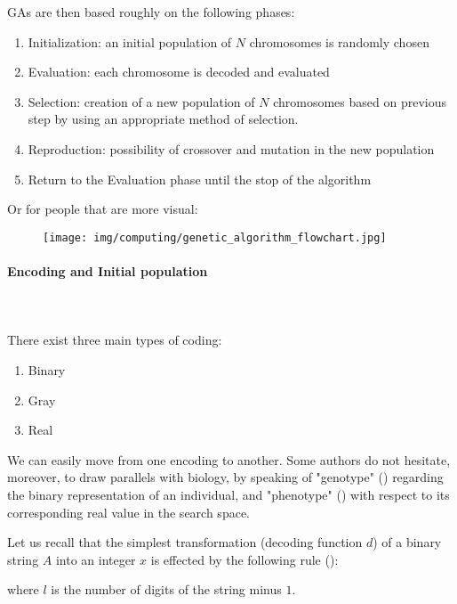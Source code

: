 	GAs are then based roughly on the following phases:
	\begin{enumerate}
		\item Initialization: an initial population of $N$ chromosomes is randomly chosen

		\item Evaluation: each chromosome is decoded and evaluated

		\item Selection: creation of a new population of $N$ chromosomes based on previous step by using an appropriate method of selection.

		\item Reproduction: possibility of crossover and mutation in the new population

		\item Return to the Evaluation phase until the stop of the algorithm
	\end{enumerate}
	Or for people that are more visual:
	\begin{figure}[H]
		\centering
		\texttt{[image: img/computing/genetic\_algorithm\_flowchart.jpg]}
	\end{figure}
	
	\paragraph{Encoding and Initial population}\mbox{}\\\\
	There exist three main types of coding:
	\begin{enumerate}
		\item Binary
		\item Gray
		\item Real
	\end{enumerate}
	We can easily move from one encoding to another. Some authors do not hesitate, moreover, to draw parallels with biology, by speaking of "genotype" () regarding the binary representation of an individual, and "phenotype" () with respect to its corresponding real value in the search space.

	Let us recall that the simplest transformation (decoding function $d$) of a binary string $A$ into an integer $x$ is effected by the following rule ():
	
	where $l$ is the number of digits of the string minus $1$.	
	
